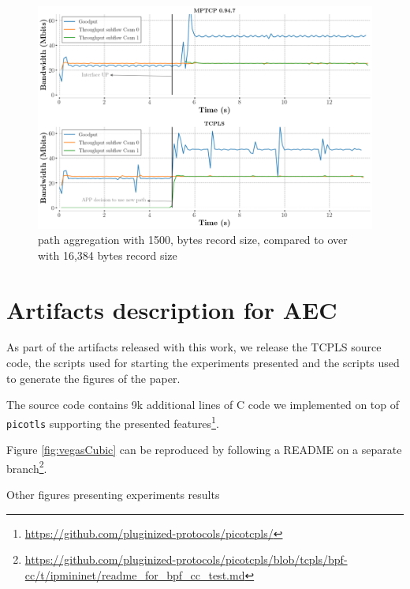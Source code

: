 \begin{figure}
  \includegraphics[width=.8\columnwidth]{figures/aggregate_1500bytes_records_dual.png}
  \caption{\tcpls path aggregation with 1500, bytes record size, compared to
    \tls over \mptcp with 16,384 bytes record size}
  \label{fig:aggregation_1500bytes_records}
\end{figure}

\section{Artifacts description for AEC}

As part of the artifacts released with this work, we release the TCPLS source 
code, the scripts used for starting the experiments presented and 
the scripts used to generate the figures of the paper.

The source code contains 9k additional lines of C code we implemented on top of 
\texttt{picotls} supporting the presented 
features\footnote{\url{https://github.com/pluginized-protocols/picotcpls/}}.

Figure \ref{fig:vegasCubic} can be reproduced by following a README on a 
separate 
branch\footnote{\url{https://github.com/pluginized-protocols/picotcpls/blob/tcpls/bpf-cc/t/ipmininet/readme_for_bpf_cc_test.md}}.

Other figures presenting experiments results
